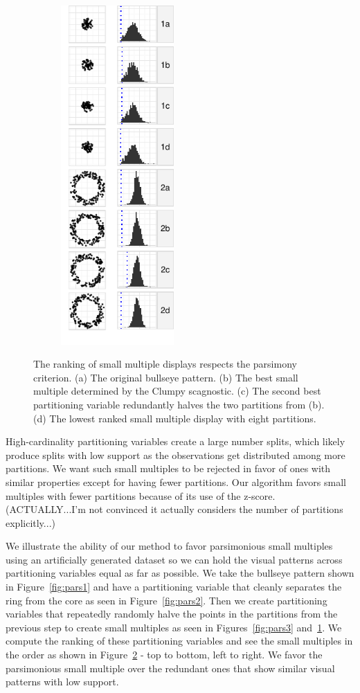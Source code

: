 \begin{figure}
\begin{subfigure}[b]{1.7in}
	\includegraphics[width=1.7in]{images/5_12851615653375-cluster2.pdf}
      \caption{}
      \label{fig:pars4}
    \end{subfigure}
    \caption{The ranking of small multiple displays respects the parsimony criterion. (a) The original bullseye pattern. (b) The best small multiple determined by the Clumpy scagnostic. (c) The second best partitioning variable redundantly halves the two partitions from (b). (d) The lowest ranked small multiple display with eight partitions.}
    \label{fig:parsimonious}
  \end{figure}

High-cardinality partitioning variables create a large number splits, which likely produce splits with low support as the observations get distributed among more partitions. We want such small multiples to be 
rejected in favor of ones with similar properties except for having fewer partitions. Our algorithm favors small multiples with fewer partitions because of its use of the z-score. (ACTUALLY...I'm not convinced it actually considers the number of partitions explicitly...)

We illustrate the ability of our method to favor parsimonious small multiples using an artificially generated dataset so we can hold the visual patterns across partitioning variables equal as far as possible. We take the bullseye pattern shown in Figure~\ref{fig:pars1} and have a partitioning variable that cleanly separates the ring from the core as seen in Figure~\ref{fig:pars2}. Then we create partitioning variables that repeatedly randomly halve the points in the partitions from the previous step to create small multiples as seen in Figures~\ref{fig:pars3} and~\ref{fig:pars4}. We compute the ranking of these partitioning variables and see the small multiples in the order as shown in Figure~\ref{fig:parsimonious} - top to bottom, left to right. We favor the parsimonious small multiple over the redundant ones that show similar visual patterns with low support. 

